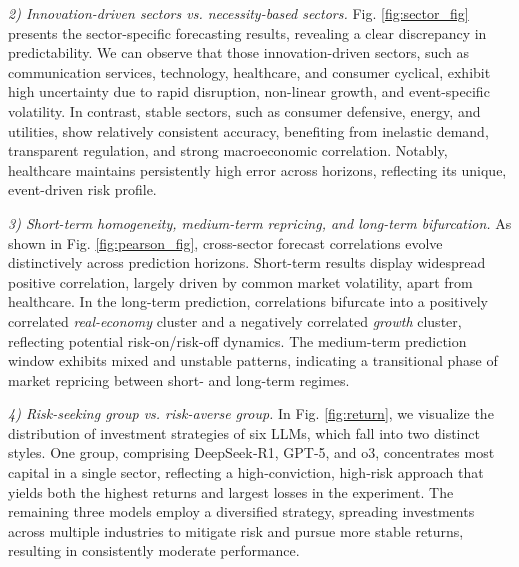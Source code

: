 \documentclass[conference]{IEEEtran}
\begin{document}
  
\textit{2) Innovation-driven sectors vs. necessity-based sectors.}
Fig. \ref{fig:sector_fig} presents the sector-specific forecasting results, revealing a clear discrepancy in predictability.
We can observe that those innovation-driven sectors, such as communication services, technology, healthcare, and consumer cyclical, exhibit high uncertainty due to rapid disruption, non-linear growth, and event-specific volatility.
In contrast, stable sectors, such as consumer defensive, energy, and utilities, show relatively consistent accuracy, benefiting from inelastic demand, transparent regulation, and strong macroeconomic correlation. Notably, healthcare maintains persistently high error across horizons, reflecting its unique, event-driven risk profile.
 
\textit{3) Short-term homogeneity, medium-term repricing, and long-term bifurcation.}
As shown in Fig. \ref{fig:pearson_fig}, cross-sector forecast correlations evolve distinctively across prediction horizons. 
Short-term results display widespread positive correlation, largely driven by common market volatility, apart from healthcare.
In the long-term prediction, correlations bifurcate into a positively correlated {\it real-economy} cluster and a negatively correlated {\it growth} cluster, reflecting potential risk‑on/risk‑off dynamics. 
The medium-term prediction window exhibits mixed and unstable patterns, indicating a transitional phase of market repricing between short- and long-term regimes.

\textit{4) Risk-seeking group vs. risk-averse group.}
In Fig. \ref{fig:return}, we visualize the distribution of investment strategies of six LLMs, which 
fall into two distinct styles. 
One group, comprising DeepSeek‑R1, GPT‑5, and o3, concentrates most capital in a single sector, reflecting a high‑conviction, high‑risk approach that yields both the highest returns and largest losses in the experiment.
The remaining three models employ a diversified strategy, spreading investments across multiple industries to mitigate risk and pursue more stable returns, resulting in consistently moderate performance.
\end{document}

